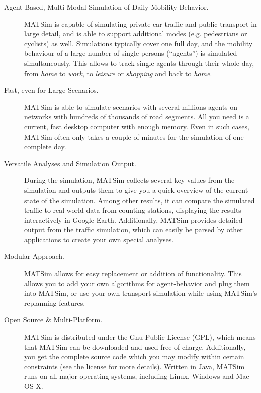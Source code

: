 \begin{description}\styleItemize
\item[Agent-Based, Multi-Modal Simulation of Daily Mobility Behavior.] MATSim is
capable of simulating private car traffic and public transport in large detail, and is able
to support additional modes (e.g. pedestrians or cyclists) as well. Simulations
typically cover one full day, and the mobility behaviour of a large number of
single persons (``agents'') is simulated simultaneously. This allows to track
single agents through their whole day, from \emph{home} to \emph{work}, to
\emph{leisure} or \emph{shopping} and back to \emph{home}.

\item[Fast, even for Large Scenarios.] MATSim is able to simulate scenarios with
several millions agents on networks with hundreds of thousands of road segments.
All you need is a current, fast desktop computer with enough memory. Even in
such cases, MATSim often only takes a couple of minutes for the simulation of
one complete day.


\item[Versatile Analyses and Simulation Output.]
During the simulation, MATSim collects several key values from the 
simulation and outputs them to give you a quick overview of the current state
of the simulation. Among other results, it can compare the simulated traffic to
real world data from counting stations, displaying the results interactively in
Google Earth. Additionally, MATSim provides  detailed output from the traffic
simulation, which can easily be parsed by other applications to create
your own special analyses.

\item[Modular Approach.] MATSim allows for easy replacement or addition of
functionality. This allows you to add your own algorithms for agent-behavior
and plug them into  MATSim, or use your own transport simulation while using
MATSim's replanning features.

\item[Open Source \& Multi-Platform.]
MATSim is  distributed under the Gnu Public License (GPL), which means that
MATSim  can be downloaded and used free of charge. Additionally, you get the 
complete source code which you may modify within certain constraints  (see the
license for more details). Written in Java, MATSim runs on all  major operating
systems, including Linux, Windows and Mac OS X.


\end{description}
